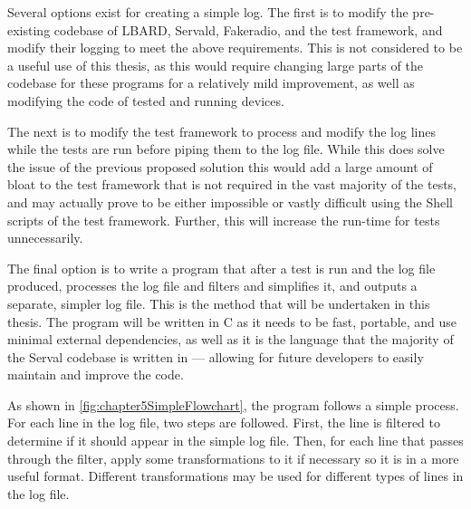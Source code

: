 Several options exist for creating a simple log.
The first is to modify the pre-existing codebase of LBARD, Servald, Fakeradio, and the test framework, and modify their logging to meet the above requirements.
This is not considered to be a useful use of this thesis, as this would require changing large parts of the codebase for these programs for a relatively mild improvement, as well as modifying the code of tested and running devices.

The next is to modify the test framework to process and modify the log lines while the tests are run before piping them to the log file.
While this does solve the issue of the previous proposed solution this would add a large amount of bloat to the test framework that is not required in the vast majority of the tests, and may actually prove to be either impossible or vastly difficult using the Shell scripts of the test framework.
Further, this will increase the run-time for tests unnecessarily.

The final option is to write a program that after a test is run and the log file produced, processes the log file and filters and simplifies it, and outputs a separate, simpler log file. 
This is the method that will be undertaken in this thesis. 
The program will be written in C as it needs to be fast, portable, and use minimal external dependencies, as well as it is the language that the majority of the Serval codebase is written in — allowing for future developers to easily maintain and improve the code.

As shown in \figurename{ \ref{fig:chapter5SimpleFlowchart}}, the program follows a simple process.
For each line in the log file, two steps are followed.
First, the line is filtered to determine if it should appear in the simple log file. 
Then, for each line that passes through the filter, apply some transformations to it if necessary so it is in a more useful format.
Different transformations may be used for different types of lines in the log file.


